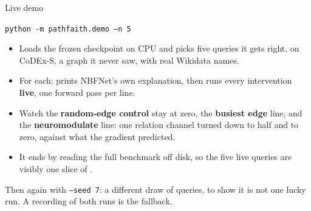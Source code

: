 \documentclass[aspectratio=169,11pt]{beamer}
\begin{document}
\begin{frame}{Live demo}
\begin{center}
\Large\texttt{python -m pathfaith.demo --n 5}
\end{center}
\vspace{0.6em}
\begin{itemize}
  \item Loads the frozen checkpoint on CPU and picks five queries it gets right,
        on CoDEx-S, a graph it never saw, with real Wikidata names.
  \item For each: prints NBFNet's own explanation, then runs every intervention
        \textbf{live}, one forward pass per line.
  \item Watch the \textbf{random-edge control} stay at zero, the
        \textbf{busiest edge} line, and the \textbf{neuromodulate} line: one
        relation channel turned down to half and to zero, against what the
        gradient predicted.
  \item It ends by reading the full benchmark off disk, so the five live
        queries are visibly one slice of \allQueries.
\end{itemize}
\vspace{0.4em}
{\small\textcolor{soft}{Then again with \texttt{--seed 7}: a different draw
of queries, to show it is not one lucky run. A recording of both runs is the
fallback.}}
\end{frame}
\end{document}
